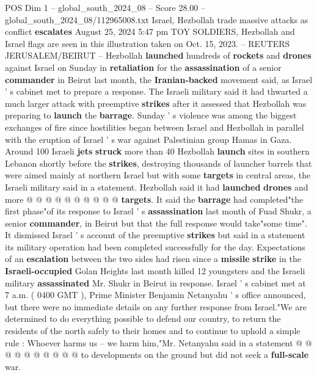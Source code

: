 \begin{textsample}{POS Dim 1 – global\_south\_2024\_08 – Score 28.00 – global\_south\_2024\_08/112965008.txt}  \label{ex:f1_pos_016}
Israel, Hezbollah trade massive attacks as conflict \textbf{escalates} August 25, 2024 5:47 pm TOY SOLDIERS, Hezbollah and Israel flags are seen in this illustration taken on Oct. 15, 2023. -- REUTERS JERUSALEM/BEIRUT -- Hezbollah \textbf{launched} hundreds of \textbf{rockets} and \textbf{drones} against Israel on Sunday in \textbf{retaliation} for the \textbf{assassination} of a senior \textbf{commander} in Beirut last month, the \textbf{Iranian-backed} movement said, as Israel ' s cabinet met to prepare a response.
The Israeli military said it had thwarted a much larger attack with preemptive \textbf{strikes} after it assessed that Hezbollah was preparing to \textbf{launch} the \textbf{barrage}.
Sunday ' s violence was among the biggest exchanges of fire since hostilities began between Israel and Hezbollah in parallel with the eruption of Israel ' s war against Palestinian group Hamas in Gaza.
Around 100 Israeli \textbf{jets} \textbf{struck} more than 40 Hezbollah \textbf{launch} sites in southern Lebanon shortly before the \textbf{strikes}, destroying thousands of launcher barrels that were aimed mainly at northern Israel but with some \textbf{targets} in central areas, the Israeli military said in a statement.
Hezbollah said it had \textbf{launched} \textbf{drones} and more @ @ @ @ @ @ @ @ @ @ \textbf{targets}.
It said the \textbf{barrage} had completed"the first phase"of its response to Israel ' s \textbf{assassination} last month of Fuad Shukr, a senior \textbf{commander}, in Beirut but that the full response would take"some time".
It dismissed Israel ' s account of the preemptive \textbf{strikes} but said in a statement its military operation had been completed successfully for the day.
Expectations of an \textbf{escalation} between the two sides had risen since a \textbf{missile} \textbf{strike} in the \textbf{Israeli-occupied} Golan Heights last month killed 12 youngsters and the Israeli military \textbf{assassinated} Mr.
Shukr in Beirut in response.
Israel ' s cabinet met at 7 a.m. ( 0400 GMT ), Prime Minister Benjamin Netanyahu ' s office announced, but there were no immediate details on any further response from Israel."We are determined to do everything possible to defend our country, to return the residents of the north safely to their homes and to continue to uphold a simple rule : Whoever harms us -- we harm him,"Mr.
Netanyahu said in a statement @ @ @ @ @ @ @ @ @ @ to developments on the ground but did not seek a \textbf{full-scale} war.

\end{textsample}
